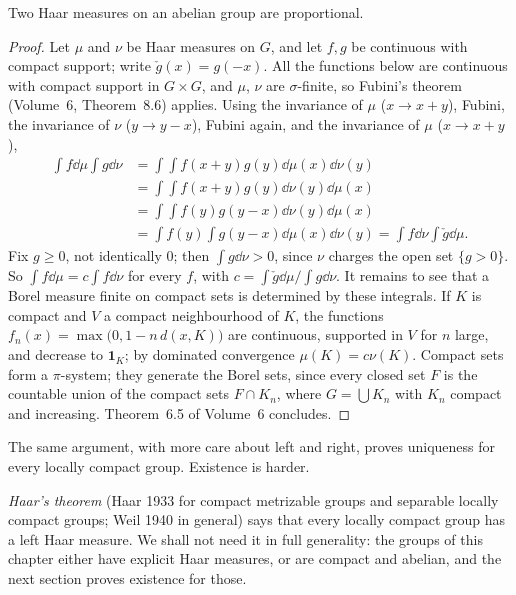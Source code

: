 \begin{theorem}[uniqueness]\label{thm:haaruniq}
Two Haar measures on an abelian group are proportional.
\end{theorem}
\begin{proof}
Let $\mu$ and $\nu$ be Haar measures on $G$, and let $f,g$ be continuous with compact support; write $\check g(x)=g(-x)$. All the functions below are continuous with compact
support in $G\times G$, and $\mu$, $\nu$ are $\sigma$-finite, so Fubini's theorem (Volume~6, Theorem~8.6) applies. Using the invariance of $\mu$ ($x\to x+y$),
Fubini, the invariance of $\nu$ ($y\to y-x$), Fubini again, and the invariance of $\mu$ ($x\to x+y$),
\[\begin{aligned}\int f\dd\mu\int g\dd\nu&=\int\!\!\int f(x+y)g(y)\dd\mu(x)\dd\nu(y)\\&=\int\!\!\int f(x+y)g(y)\dd\nu(y)\dd\mu(x)\\&=\int\!\!\int f(y)g(y-x)\dd\nu(y)\dd\mu(x)\\&=\int f(y)\int g(y-x)\dd\mu(x)\dd\nu(y)=\int f\dd\nu\int\check g\dd\mu.\end{aligned}\]
Fix $g\ge0$, not identically $0$; then $\int g\dd\nu>0$, since $\nu$ charges the open set $\{g>0\}$. So $\int f\dd\mu=c\int f\dd\nu$ for every $f$, with
$c=\int\check g\dd\mu/\int g\dd\nu$. It remains to see that a Borel measure finite on compact sets is determined by these integrals. If $K$ is compact and $V$ a
compact neighbourhood of $K$, the functions $f_n(x)=\max\bigl(0,1-n\,d(x,K)\bigr)$ are continuous, supported in $V$ for $n$ large, and decrease to $\mathbf 1_K$; by
dominated convergence $\mu(K)=c\nu(K)$. Compact sets form a $\pi$-system; they generate the Borel sets, since every closed set $F$ is the countable union
of the compact sets $F\cap K_n$, where $G=\bigcup K_n$ with $K_n$ compact and increasing. Theorem~6.5 of Volume~6 concludes.
\end{proof}

The same argument, with more care about left and right, proves uniqueness for every locally compact group. Existence is harder.

\begin{remark}
\emph{Haar's theorem} (Haar 1933 for compact metrizable groups and separable locally compact groups; Weil 1940 in general) says that every locally compact group
has a left Haar measure. We shall not need it in full generality: the groups of this chapter either have explicit Haar measures, or are compact and
abelian, and the next section proves existence for those.
\end{remark}

